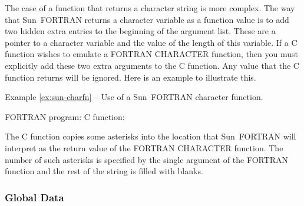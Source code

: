 The case of a function that returns a character string is more complex. The way
that Sun~FORTRAN returns a character variable as a function value is to add two
hidden extra entries to the beginning of the argument list. These are a pointer
to a character variable and the value of the length of this variable. If a C
function wishes to emulate a FORTRAN CHARACTER function, then you must
explicitly add these two extra arguments to the C function. Any value that the
C function returns will be ignored. Here is an example to illustrate this.

\label{ex:sun-charfn}
\begin{center}
Example \ref{ex:sun-charfn} -- Use of a Sun~FORTRAN character function.
\end{center}
\nopagebreak[4]
FORTRAN program:
\pagebreak[1]
C function:

The C function copies some asterisks into the location that Sun~FORTRAN will
interpret as the return value of the FORTRAN CHARACTER function. The number of
such asterisks is specified by the single argument of the FORTRAN function and
the rest of the string is filled with blanks.

\subsubsection{Global Data}

